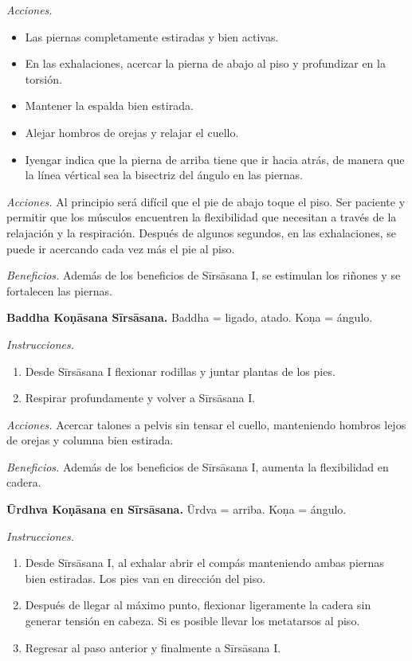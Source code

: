 \emph{Acciones.}
\begin{itemize}
\item Las piernas completamente estiradas y
bien activas.
\item En las exhalaciones, acercar la pierna
de abajo al piso y profundizar en la torsión.
\item Mantener la espalda bien estirada.
\item Alejar hombros de orejas y relajar el
cuello.
\item Iyengar indica que la pierna de arriba
tiene que ir hacia atrás, de manera que la
línea vértical sea la bisectriz del ángulo en
las piernas.
\end{itemize}

\emph{Acciones.} Al principio será difícil
que el pie de abajo toque el piso. Ser
paciente y permitir que los músculos
encuentren la flexibilidad que necesitan a
través de la relajación y la respiración.
Después de algunos segundos, en las
exhalaciones, se puede ir acercando cada vez
más el pie al piso.

\emph{Beneficios.} Además de los beneficios
de Sīrsāsana I, se estimulan los riñones y se
fortalecen las piernas.

\medskip\noindent\textbf{Baddha Koṇāsana
Sīrsāsana.}
Baddha = ligado, atado. Koṇa = ángulo.

\emph{Instrucciones.}
\begin{enumerate}
\item Desde Sīrsāsana I flexionar rodillas y
juntar plantas de los pies.
\item Respirar profundamente y volver a
Sīrsāsana I.
\end{enumerate}

\emph{Acciones.} Acercar talones a pelvis sin
tensar el cuello, manteniendo hombros lejos
de orejas y columna bien estirada.

\emph{Beneficios.} Además de los beneficios
de Sīrsāsana I, aumenta la flexibilidad en
cadera.

\medskip\noindent\textbf{Ūrdhva Koṇāsana en
Sīrsāsana.}
Ūrdva = arriba. Koṇa = ángulo.

\emph{Instrucciones.}
\begin{enumerate}
\item Desde Sīrsāsana I, al exhalar abrir el
compás manteniendo ambas piernas bien
estiradas. Los pies van en dirección del
piso.
\item Después de llegar al máximo punto,
flexionar ligeramente la cadera sin generar
tensión en cabeza. Si es posible llevar los
metatarsos al piso.
\item Regresar al paso anterior y finalmente
a Sīrsāsana I.
\end{enumerate}

